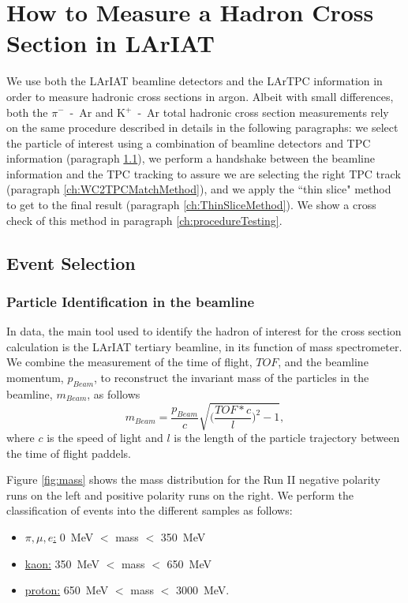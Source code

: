\section{How to Measure a Hadron Cross Section in LArIAT}\label{ch:methodology}
We use both the LArIAT  beamline detectors and the LArTPC information in order to measure hadronic cross sections in argon. Albeit with small differences, both the  $\pi^{-}$~-~Ar and K$^{+}$~-~Ar total hadronic cross section measurements rely on the same procedure described in details in the following paragraphs: we select the particle of interest using a combination of beamline detectors and TPC information (paragraph \ref{ch:ParticleSelectionMethod}), we perform a handshake between the beamline information and the TPC tracking to assure we are selecting the right TPC track (paragraph \ref{ch:WC2TPCMatchMethod}), and we apply the ``thin slice" method to get to the final result (paragraph \ref{ch:ThinSliceMethod}). We show a cross check of this method in paragraph \ref{ch:procedureTesting}.

\subsection{Event Selection}\label{ch:ParticleSelectionMethod}

\subsubsection{Particle Identification in the beamline}
In data, the main tool used to identify the hadron of interest for the cross section calculation is the LArIAT tertiary beamline, in its function of mass spectrometer. We combine the measurement of the time of flight, $TOF$, and the beamline momentum, $p_{Beam}$, to reconstruct the invariant mass of the particles in the beamline, $m_{Beam}$, as follows
\begin{equation}
m_{Beam} = \frac{p_{Beam}}{c}\sqrt{\biggl(\frac{TOF*c}{l}\biggr)^2 -1},
\end{equation}
 where $c$ is the speed of light and $l$ is the length of the particle trajectory between the time of flight paddels. 

Figure \ref{fig:mass} shows the mass distribution for the Run II negative polarity runs on the left and positive polarity runs on the right. We perform the classification of events into the different samples as follows:

\begin{itemize}
\item \underline{$\pi, \mu, e$:} 0~MeV $<$ mass $<$ 350~MeV

\item \underline{kaon:} 350~MeV $<$ mass $<$ 650~MeV

\item \underline{proton:} 650~MeV $<$ mass $<$ 3000~MeV.

\end{itemize}



